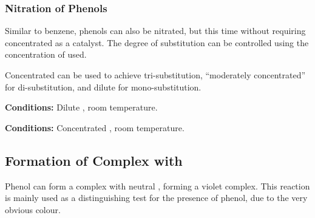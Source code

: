 
			\pagebreak

			\subsubsection{Nitration of Phenols}

				Similar to benzene, phenols can also be nitrated, but this time without requiring concentrated  as a catalyst.
				The degree of substitution can be controlled using the concentration of  used.

				Concentrated  can be used to achieve tri-substitution, \enquote{moderately concentrated} for di-substitution, and
				dilute  for mono-substitution.

				\vspace{1.5em}
				\vbox{\textbf{Conditions:}	\tabto{35mm}Dilute , room temperature.}


				\vspace{1.5em}
				\vbox{\textbf{Conditions:}	\tabto{35mm}Concentrated , room temperature.}





		\pagebreak
		\subsection{Formation of Complex with }

			Phenol can form a complex with neutral , forming a violet complex. This reaction is mainly
			used as a distinguishing test for the presence of phenol, due to the very obvious colour.

